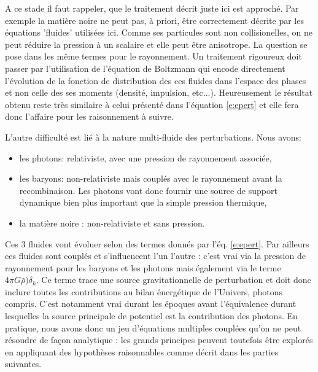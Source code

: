  A ce stade il faut rappeler, que le traitement décrit juste ici est approché. Par exemple la matière noire  ne peut pas, à priori, être correctement décrite par les équations 'fluides' utilisées ici. Comme ses particules sont non collisionelles, on ne peut réduire la pression à un scalaire et elle peut être anisotrope. La question se pose dans les même termes pour le rayonnement. Un traitement rigoureux doit passer par l'utilisation de l'équation de Boltzmann qui encode directement l'évolution de la fonction de distribution des ces fluides dans l'espace des phases et non celle des ses moments (densité, impulsion, etc...).  Heureusement le résultat obtenu reste très similaire à celui présenté dans l'équation \ref{e:epert} et elle fera donc l'affaire pour les raisonnement à suivre.
 
 L'autre difficulté est lié à la nature multi-fluide des perturbations. Nous avons:
 \begin{itemize}
 \item les photons: relativiste, avec une pression de rayonnement associée,
 \item les baryons: non-relativiste mais couplés avec le rayonnement avant la recombinaison. Les photons vont donc fournir une source de support dynamique bien plus important que la simple pression thermique,
 \item la matière noire : non-relativiste et sans pression.
 \end{itemize}
 Ces 3 fluides vont évoluer selon des termes donnés par l'éq. \ref{e:epert}. Par ailleurs ces fluides sont couplés et s'influencent l'un l'autre : c'est vrai via la pression de rayonnement pour les baryons et les photons mais également via le terme $4\pi G \bar \rho)\delta_k$. Ce terme trace une source gravitationnelle de perturbation et doit donc inclure toutes les contributions au bilan énergétique de l'Univers, photons compris. C'est notamment vrai durant les époques avant l'équivalence  durant lesquelles la source principale de potentiel est la contribution des photons. En pratique, nous avons donc un jeu d'équations multiples couplées qu'on ne peut résoudre de façon analytique : les grands principes peuvent toutefois être explorés en appliquant des hypothèses raisonnables comme décrit dans les parties suivantes.
 
